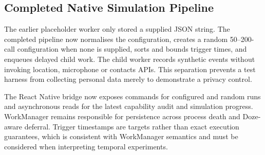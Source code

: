 
\subsection{Completed Native Simulation Pipeline}

The earlier placeholder worker only stored a supplied JSON string. The completed pipeline now normalises the configuration, creates a random 50--200-call configuration when none is supplied, sorts and bounds trigger times, and enqueues delayed child work. The child worker records synthetic events without invoking location, microphone or contacts APIs. This separation prevents a test harness from collecting personal data merely to demonstrate a privacy control.

The React Native bridge now exposes commands for configured and random runs and asynchronous reads for the latest capability audit and simulation progress. WorkManager remains responsible for persistence across process death and Doze-aware deferral. Trigger timestamps are targets rather than exact execution guarantees, which is consistent with WorkManager semantics and must be considered when interpreting temporal experiments.
